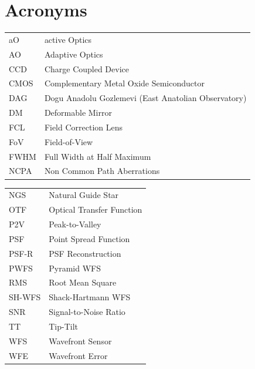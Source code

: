 \documentclass[12pt,a4paper]{article}
\begin{document}

\setlength{\parindent}{0pt}%


\section*{Acronyms}
\afterpage{\cfoot{\thepage}}

\begin{minipage}[c]{0.5\textwidth}
\begin{center}
\begin{tabular}{p{13mm}|p{55mm}}
aO & active Optics \\
AO & Adaptive Optics \\
CCD & Charge Coupled Device\\
CMOS & Complementary Metal Oxide Semiconductor\\
DAG & Dogu Anadolu Gozlemevi (East Anatolian Observatory)\\
DM & Deformable Mirror\\
FCL & Field Correction Lens\\
FoV & Field-of-View\\
FWHM & Full Width at Half Maximum\\
NCPA & Non Common Path Aberrations
\end{tabular}
\end{center}
\end{minipage}
\begin{minipage}[c]{0.5\textwidth}
\begin{center}
\begin{tabular}{p{16mm}|p{55mm}}
NGS & Natural Guide Star \\
OTF & Optical Transfer Function\\
P2V & Peak-to-Valley\\
PSF & Point Spread Function\\
PSF-R & PSF Reconstruction\\
PWFS & Pyramid WFS\\
RMS & Root Mean Square\\
SH-WFS & Shack-Hartmann WFS\\
SNR & Signal-to-Noise Ratio\\
TT & Tip-Tilt\\
WFS & Wavefront Sensor\\
WFE & Wavefront Error
\end{tabular}
\end{center}
\end{minipage}
\newpage
\end{document}
